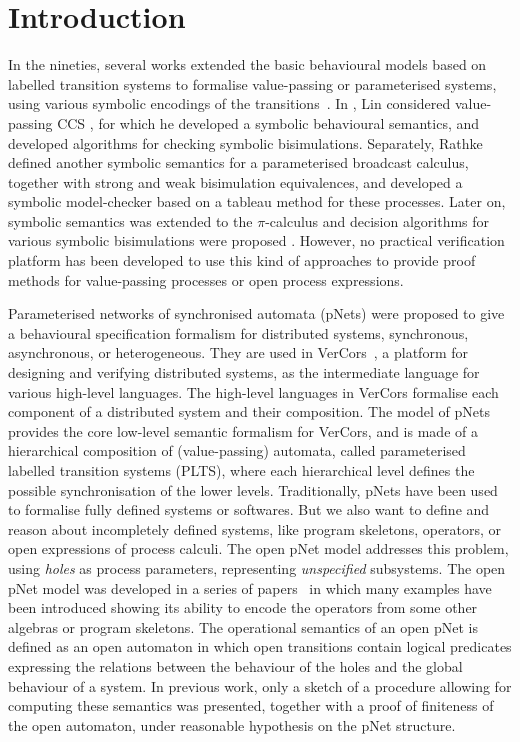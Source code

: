 \documentclass[smallcondensed]{svjour3}
\begin{document}
\section{Introduction}
In the nineties, several 
works extended the basic behavioural models based on labelled
transition systems to formalise value-passing or parameterised systems, using
various symbolic encodings of the
transitions~\cite{deSimone85,Larsen87,HennessyLin:TCS95,Linconcur96}. 
In \cite{Linconcur96}, Lin considered value-passing CCS \cite{Milner89}, for which he
developed a symbolic behavioural semantics, and developed algorithms for checking symbolic bisimulations.
Separately, Rathke~\cite{HennessyRathke:TCS98} defined another
symbolic semantics for 
a parameterised broadcast calculus, together with strong and weak bisimulation
equivalences, and developed a symbolic model-checker based on a tableau
method for these processes. 
Later on, symbolic semantics was extended to the $\pi$-calculus \cite{Milner99} and decision algorithms for various symbolic bisimulations were proposed \cite{Li99,Deng2001}. However, no
practical verification platform has been developed to use this kind of approaches to provide proof methods for
value-passing processes or open process expressions. 

Parameterised networks of synchronised automata (pNets) were proposed
to give a behavioural specification formalism for distributed
systems, synchronous, asynchronous, or heterogeneous. They are used in
VerCors~\cite{HKLM:Foclasa14}, a platform for designing and 
verifying distributed systems, as the intermediate language for various
high-level languages. The high-level languages in VerCors formalise
each component of a distributed system and their composition. The model of
pNets provides the core low-level semantic formalism for VerCors, and
is made of a hierarchical composition of (value-passing) automata,
called parameterised labelled transition systems (PLTS), where each
hierarchical level defines the possible synchronisation of the lower levels.
Traditionally, pNets have been used to formalise fully
defined systems or softwares. But we  also want to define and reason
about incompletely defined systems, like program skeletons, operators,
or open expressions of process calculi.
The open pNet model addresses this problem, using
\emph{holes} as process parameters, representing \emph{unspecified} subsystems.
The open pNet model was developed in a series of
papers~\cite{HMZ:PDP15,henrio:Forte2016} in which many examples have been
introduced showing its ability to encode the operators from some
other algebras or  program skeletons.
The operational semantics of an open pNet is defined as an
open automaton in which open transitions contain logical predicates
expressing the relations between the behaviour of the holes and the
global behaviour of a system. In previous work,
only a sketch of a procedure allowing for computing these semantics was
presented, together with a proof of finiteness of the open automaton, under
reasonable hypothesis on the pNet structure.
\end{document}
